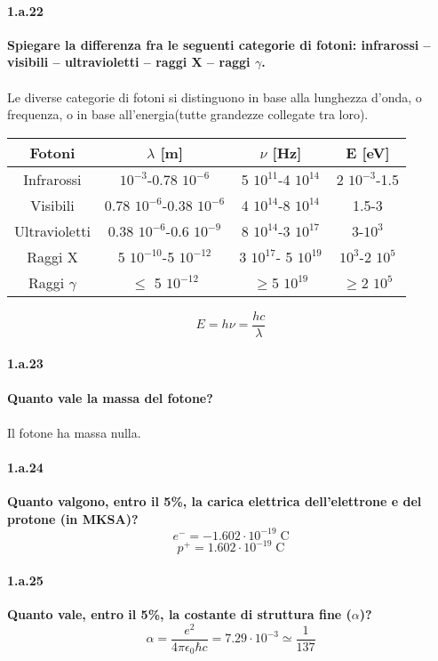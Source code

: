 \documentclass[twoside]{article}
\begin{document}
\paragraph{1.a.22} \textbf{Spiegare la differenza fra le seguenti categorie di fotoni: infrarossi – visibili –
ultravioletti – raggi X – raggi $\gamma$.}\\
\\
Le diverse categorie di fotoni si distinguono in base alla lunghezza d'onda, o frequenza, o in base all'energia(tutte grandezze collegate tra loro).
\begin{table}[H]
    \centering
    \begin{tabular}{c|c|c|c}
    Fotoni & $\lambda$ [m] & $\nu$ [Hz] & E [eV]\\
    \hline
    Infrarossi  & $10^{-3}$-0.78 $10^{-6}$&  5 $10^{11}$-4 $10^{14}$& 2 $10^{-3}$-1.5\\
    Visibili    & 0.78 $10^{-6}$-0.38 $10^{-6}$&  4 $10^{14}$-8 $10^{14}$&  1.5-3\\
    Ultravioletti   & 0.38 $10^{-6}$-0.6 $10^{-9}$ & 8 $10^{14}$-3 $10^{17}$& 3-$10^{3}$\\
    Raggi X & 5 $10^{-10}$-5 $10^{-12}$ & 3 $10^{17}$- 5 $10^{19}$ & $10^{3}$-2 $10^{5}$\\
    Raggi $\gamma$  & $\leq$ 5 $10^{-12}$ & $\geq$5 $10^{19}$  &$\geq$2 $10^{5}$\\
    \hline
    \end{tabular}
\end{table}
\[
E= h \nu= \frac{h c}{\lambda}
\]

\paragraph{1.a.23} \textbf{Quanto vale la massa del fotone?}\\
\\
Il fotone ha massa nulla.

\paragraph{1.a.24} \textbf{Quanto valgono, entro il 5\%, la carica elettrica dell’elettrone e del protone (in
MKSA)?}\\
\[
e^-=-1.602 \cdot 10^{-19} \;\text{C}
\]
\[
p^+=1.602 \cdot 10^{-19} \;\text{C}
\]

\paragraph{1.a.25}\textbf{Quanto vale, entro il 5\%, la costante di struttura fine ($\alpha$)?}\\
\[
\alpha=\frac{e^2}{4\pi \epsilon_0 \hbar c}=7.29 \cdot 10^{-3} \simeq \frac{1}{137}
\]
\end{document}
